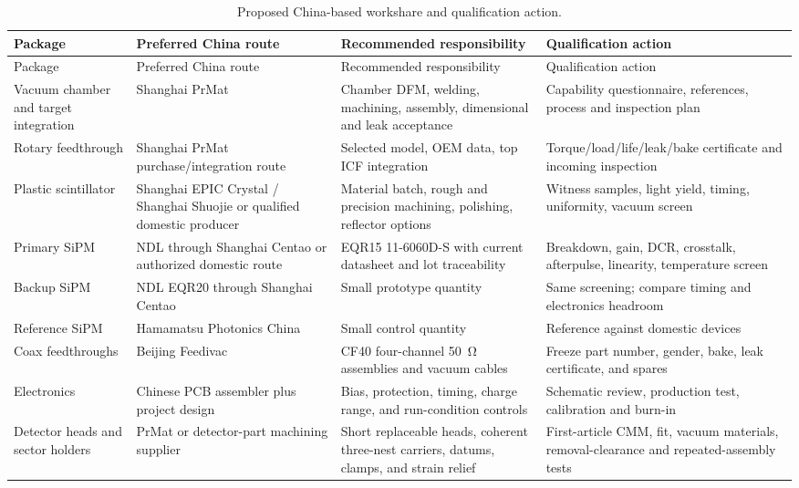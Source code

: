 \documentclass[10pt,letterpaper]{article}
\begin{document}
\begin{longtable}{L{0.17\textwidth}L{0.22\textwidth}L{0.31\textwidth}L{0.22\textwidth}}
  \caption{Proposed China-based workshare and qualification action.}\\
  \toprule
  Package & Preferred China route & Recommended responsibility & Qualification action \\
  \midrule
  \endfirsthead
  \toprule
  Package & Preferred China route & Recommended responsibility & Qualification action \\
  \midrule
  \endhead
  Vacuum chamber and target integration & Shanghai PrMat &
    Chamber DFM, welding, machining, assembly, dimensional and leak acceptance &
    Capability questionnaire, references, process and inspection plan \\
  Rotary feedthrough & Shanghai PrMat purchase/integration route &
    Selected model, OEM data, top ICF integration &
    Torque/load/life/leak/bake certificate and incoming inspection \\
  Plastic scintillator & Shanghai EPIC Crystal / Shanghai Shuojie or qualified domestic producer &
    Material batch, rough and precision machining, polishing, reflector options &
    Witness samples, light yield, timing, uniformity, vacuum screen \\
  Primary SiPM & NDL through Shanghai Centao or authorized domestic route &
    EQR15 11-6060D-S with current datasheet and lot traceability &
    Breakdown, gain, DCR, crosstalk, afterpulse, linearity, temperature screen \\
  Backup SiPM & NDL EQR20 through Shanghai Centao &
    Small prototype quantity &
    Same screening; compare timing and electronics headroom \\
  Reference SiPM & Hamamatsu Photonics China &
    Small control quantity &
    Reference against domestic devices \\
  Coax feedthroughs & Beijing Feedivac &
    CF40 four-channel \SI{50}{\ohm} assemblies and vacuum cables &
    Freeze part number, gender, bake, leak certificate, and spares \\
  Electronics & Chinese PCB assembler plus project design &
    Bias, protection, timing, charge range, and run-condition controls &
    Schematic review, production test, calibration and burn-in \\
  Detector heads and sector holders & PrMat or detector-part machining supplier &
    Short replaceable heads, coherent three-nest carriers, datums, clamps, and strain relief &
    First-article CMM, fit, vacuum materials, removal-clearance and repeated-assembly tests \\
  \bottomrule
\end{longtable}
\end{document}
